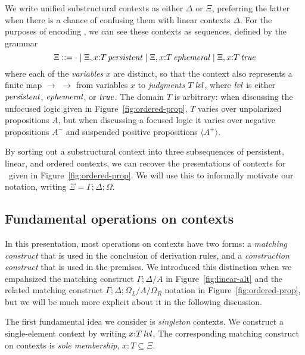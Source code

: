 We write unified substructural contexts as either $\Delta$ or $\Xi$,
preferring the latter when there is a chance of confusing them with
linear contexts $\Delta$. For the purposes of encoding \ollll, we can
see these contexts as sequences, defined by the grammar
\[
\Xi ::= \cdot 
  \mid \Xi, x{:}{T}\,{{\it persistent}}
  \mid \Xi, x{:}{T}\,{{\it ephemeral}}
  \mid \Xi, x{:}{T}\,{{\it true}}
\]
where each of the {\em variables} $x$ are distinct, so that the context
also represents a finite map $\to$ $\rightarrow$ from variables $x$ to 
{\it judgments}
${T}\,{{\it lvl}}$, where ${\it lvl}$ is either ${\it persistent}$, ${\it ephemeral}$, or ${\it true}$. 
The domain $T$ is arbitrary: when
discussing the unfocused logic given in Figure~\ref{fig:ordered-prop},
$T$ varies over unpolarized propositions $A$, but when discussing a
focused logic it varies over negative propositions $A^-$ and suspended
positive propositions $\langle A^+ \rangle$. 

By sorting out a substructural context into three subsequences of
persistent, linear, and ordered contexts, we can recover the
presentations of contexts for \ollll~given in
Figure~\ref{fig:ordered-prop}. We will use this to informally motivate
our notation, writing $\Xi = \Gamma; \Delta; \Omega$.




\subsection{Fundamental operations on contexts}

In this presentation, most operations on contexts have two forms: a
{\it matching construct} that is used in the conclusion of derivation
rules, and a {\it construction construct} that is used in the
premises.  We introduced this distinction when we empahsized the
matching construct $\Gamma; \Delta/A$ in Figure~\ref{fig:linear-alt}
and the related matching construct $\Gamma; \Delta;
\Omega_L/A/\Omega_R$ notation in Figure~\ref{fig:ordered-prop}, but we
will be much more explicit about it in the following discussion.

The first fundamental idea we consider is {\it singleton} contexts.
We construct a single-element context by writing $x{:}{T}\,{{\it lvl}}$, The
corresponding matching construct on contexts is {\it sole membership},
$x{:}T \subseteq \Xi$.

